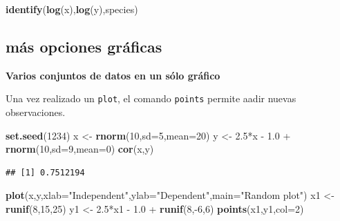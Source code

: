 \documentclass[]{article}
\newenvironment{Shaded}{\begin{snugshade}}{\end{snugshade}}
\newcommand{\KeywordTok}[1]{\textcolor[rgb]{0.13,0.29,0.53}{\textbf{{#1}}}}
\newcommand{\DataTypeTok}[1]{\textcolor[rgb]{0.13,0.29,0.53}{{#1}}}
\newcommand{\DecValTok}[1]{\textcolor[rgb]{0.00,0.00,0.81}{{#1}}}
\newcommand{\FloatTok}[1]{\textcolor[rgb]{0.00,0.00,0.81}{{#1}}}
\newcommand{\StringTok}[1]{\textcolor[rgb]{0.31,0.60,0.02}{{#1}}}
\newcommand{\NormalTok}[1]{{#1}}
\numberwithin{equation}{section}
\begin{document}
\begin{Shaded}
\begin{Highlighting}[]
\KeywordTok{identify}\NormalTok{(}\KeywordTok{log}\NormalTok{(x),}\KeywordTok{log}\NormalTok{(y),species)}
\end{Highlighting}
\end{Shaded}

\subsection{más opciones gráficas}\label{mas-opciones-graficas}

\textbf{Varios conjuntos de datos en un sólo gráfico}

Una vez realizado un \texttt{plot}, el comando \texttt{points} permite
aadir nuevas observaciones.

\begin{Shaded}
\begin{Highlighting}[]
\KeywordTok{set.seed}\NormalTok{(}\DecValTok{1234}\NormalTok{)}
 \NormalTok{x <-}\StringTok{ }\KeywordTok{rnorm}\NormalTok{(}\DecValTok{10}\NormalTok{,}\DataTypeTok{sd=}\DecValTok{5}\NormalTok{,}\DataTypeTok{mean=}\DecValTok{20}\NormalTok{)}
 \NormalTok{y <-}\StringTok{ }\FloatTok{2.5}\NormalTok{*x -}\StringTok{ }\FloatTok{1.0} \NormalTok{+}\StringTok{ }\KeywordTok{rnorm}\NormalTok{(}\DecValTok{10}\NormalTok{,}\DataTypeTok{sd=}\DecValTok{9}\NormalTok{,}\DataTypeTok{mean=}\DecValTok{0}\NormalTok{)}
 \KeywordTok{cor}\NormalTok{(x,y)}
\end{Highlighting}
\end{Shaded}

\begin{verbatim}
## [1] 0.7512194
\end{verbatim}

\begin{Shaded}
\begin{Highlighting}[]
 \KeywordTok{plot}\NormalTok{(x,y,}\DataTypeTok{xlab=}\StringTok{"Independent"}\NormalTok{,}\DataTypeTok{ylab=}\StringTok{"Dependent"}\NormalTok{,}\DataTypeTok{main=}\StringTok{"Random plot"}\NormalTok{)}
 \NormalTok{x1 <-}\StringTok{ }\KeywordTok{runif}\NormalTok{(}\DecValTok{8}\NormalTok{,}\DecValTok{15}\NormalTok{,}\DecValTok{25}\NormalTok{)}
 \NormalTok{y1 <-}\StringTok{ }\FloatTok{2.5}\NormalTok{*x1 -}\StringTok{ }\FloatTok{1.0} \NormalTok{+}\StringTok{ }\KeywordTok{runif}\NormalTok{(}\DecValTok{8}\NormalTok{,-}\DecValTok{6}\NormalTok{,}\DecValTok{6}\NormalTok{)}
 \KeywordTok{points}\NormalTok{(x1,y1,}\DataTypeTok{col=}\DecValTok{2}\NormalTok{)}
\end{Highlighting}
\end{Shaded}
\end{document}
